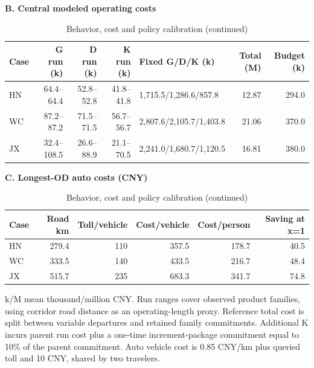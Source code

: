 \begin{table}[htbp]\centering
\ContinuedFloat
\caption{Behavior, cost and policy calibration (continued)}
\begin{minipage}{.95\textwidth}\fontsize{8}{10}\selectfont{}\setlength{\tabcolsep}{2pt}\renewcommand{\arraystretch}{1.08}
\par\noindent\textbf{B. Central modeled operating costs}\par\smallskip
\begin{tabular*}{\linewidth}{@{\extracolsep{\fill}}lrrrlrr@{}}\toprule
Case & G run (k) & D run (k) & K run (k) & Fixed G/D/K (k) & Total (M) & Budget (k) \\
\midrule
HN & 64.4--64.4 & 52.8--52.8 & 41.8--41.8 & 1,715.5/1,286.6/857.8 & 12.87 & 294.0 \\
WC & 87.2--87.2 & 71.5--71.5 & 56.7--56.7 & 2,807.6/2,105.7/1,403.8 & 21.06 & 370.0 \\
JX & 32.4--108.5 & 26.6--88.9 & 21.1--70.5 & 2,241.0/1,680.7/1,120.5 & 16.81 & 380.0 \\
\bottomrule\end{tabular*}\par\medskip
\par\noindent\textbf{C. Longest-OD auto costs (CNY)}\par\smallskip
\begin{tabular*}{\linewidth}{@{\extracolsep{\fill}}lrrrrr@{}}\toprule
Case & Road km & Toll/vehicle & Cost/vehicle & Cost/person & Saving at x=1 \\
\midrule
HN & 279.4 & 110 & 357.5 & 178.7 & 40.5 \\
WC & 333.5 & 140 & 433.5 & 216.7 & 48.4 \\
JX & 515.7 & 235 & 683.3 & 341.7 & 74.8 \\
\bottomrule\end{tabular*}\par\medskip
\par\noindent\fontsize{8}{9.5}\selectfont k/M mean thousand/million CNY. Run ranges cover observed product families, using corridor road distance as an operating-length proxy. Reference total cost is split between variable departures and retained family commitments. Additional K incurs parent run cost plus a one-time increment-package commitment equal to 10\% of the parent commitment. Auto vehicle cost is 0.85 CNY/km plus queried toll and 10 CNY, shared by two travelers.
\end{minipage}\end{table}
